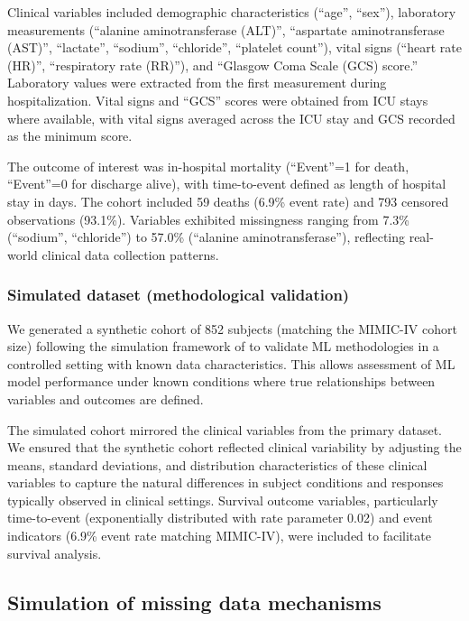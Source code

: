 \documentclass[pdflatex,sn-mathphys-num]{sn-jnl}%
\theoremstyle{thmstyleone}%
\theoremstyle{thmstyletwo}%
\theoremstyle{thmstylethree}%
\begin{document}
Clinical variables included demographic characteristics (``age'', ``sex''), laboratory measurements (``alanine aminotransferase (ALT)'', ``aspartate aminotransferase (AST)'', ``lactate'', ``sodium'', ``chloride'', ``platelet count''), vital signs (``heart rate (HR)'', ``respiratory rate (RR)''), and ``Glasgow Coma Scale (GCS) score.'' Laboratory values were extracted from the first measurement during hospitalization. Vital signs and ``GCS'' scores were obtained from ICU stays where available, with vital signs averaged across the ICU stay and GCS recorded as the minimum score.

The outcome of interest was in-hospital mortality (``Event''=1 for death, ``Event''=0 for discharge alive), with time-to-event defined as length of hospital stay in days. The cohort included 59 deaths (6.9\% event rate) and 793 censored observations (93.1\%). Variables exhibited missingness ranging from 7.3\% (``sodium'', ``chloride'') to 57.0\% (``alanine aminotransferase''), reflecting real-world clinical data collection patterns.

\subsubsection{Simulated dataset (methodological validation)}
We generated a synthetic cohort of 852 subjects (matching the MIMIC-IV cohort size) following the simulation framework of \cite{yang2024} to validate ML methodologies in a controlled setting with known data characteristics. This allows assessment of ML model performance under known conditions where true relationships between variables and outcomes are defined.

The simulated cohort mirrored the clinical variables from the primary dataset. We ensured that the synthetic cohort reflected clinical variability by adjusting the means, standard deviations, and distribution characteristics of these clinical variables to capture the natural differences in subject conditions and responses typically observed in clinical settings. Survival outcome variables, particularly time-to-event (exponentially distributed with rate parameter 0.02) and event indicators (6.9\% event rate matching MIMIC-IV), were included to facilitate survival analysis.

\subsection{Simulation of missing data mechanisms}
\end{document}
